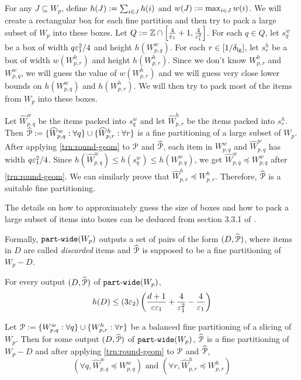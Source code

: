For any $J \subseteq W_p$, define
$h(J) := \sum_{i \in J} h(i)$ and $w(J) := \max_{i \in J} w(i)$.
We will create a rectangular box for each fine partition
and then try to pack a large subset of $W_p$ into these boxes.
Let $Q := \mathbb{Z} \cap \left[\frac{4}{\varepsilon_1}+1, \frac{4}{\varepsilon_1^2}\right]$.
For each $q \in Q$, let $s^w_q$ be a box
of width $q\varepsilon_1^2/4$ and height $h(W^w_{p,q})$.
For each $r \in [1/\delta_{\mathrm{lg}}]$, let $s^h_r$ be a box
of width $w(W^h_{p,r})$ and height $h(W^h_{p,r})$.
Since we don't know $W^h_{p,r}$ and $W^w_{p,q}$,
we will guess the value of $w(W^h_{p,r})$ and
we will guess very close lower bounds on $h(W^w_{p,q})$ and $h(W^h_{p,r})$.
We will then try to pack most of the items from $W_p$ into these boxes.

Let $\widehat{W}^w_{p,q}$ be the items packed into $s^w_q$ and
let $\widehat{W}^h_{p,r}$ be the items packed into $s^h_r$.
Then $\widehat{\mathcal{P}} := \{\widehat{W}_{p,q}^w: \forall q\} \cup \{\widehat{W}_{p,r}^h: \forall r\}$
is a fine partitioning of a large subset of $W_p$.
After applying \cref{trn:round-geom} to $\mathcal{P}$ and $\widehat{\mathcal{P}}$,
each item in $W^w_{p,q}$ and $\widehat{W}^w_{p,q}$ has width $q\varepsilon_1^2/4$.
Since $h(\widehat{W}^w_{p,q}) \le h(s^w_q) \le h(W^w_{p,q})$,
we get $\widehat{W}^w_{p,q} \preceq W^w_{p,q}$ after \cref{trn:round-geom}.
We can similarly prove that $\widehat{W}^h_{p,r} \preceq W^h_{p,r}$.
Therefore, $\widehat{\mathcal{P}}$ is a suitable fine partitioning.

The details on how to approximately guess the size of boxes
and how to pack a large subset of items into boxes can be deduced from
section 3.3.1 of \cite{pradel-thesis}.

Formally, $\operatorname{\mathtt{part-wide}}(W_p)$ outputs a set of pairs of the form $(D, \widehat{\mathcal{P}})$,
where items in $D$ are called \emph{discarded} items and $\widehat{\mathcal{P}}$ is supposed to be
a fine partitioning of $W_p - D$.

\begin{claim}
\label{lem:part-wide-discard}
For every output $(D, \widehat{\mathcal{P}})$ of $\operatorname{\mathtt{part-wide}}(W_p)$,
\[ h(D) \le (3\varepsilon_2)\left( \frac{d+1}{\varepsilon\varepsilon_1} + \frac{4}{\varepsilon_1^2}
    - \frac{4}{\varepsilon_1} \right) \]
\end{claim}

\begin{claim}
\label{lem:part-wide}
Let $\mathcal{P} := \{W_{p,q}^w: \forall q\} \cup \{W_{p,r}^h: \forall r\}$ be
a balanced fine partitioning of a slicing of $W_p$.
Then for some output $(D, \widehat{\mathcal{P}})$ of $\operatorname{\mathtt{part-wide}}(W_p)$,
$\widehat{\mathcal{P}}$ is a fine partitioning of $W_p - D$
and after applying \cref{trn:round-geom} to $\mathcal{P}$ and $\widehat{\mathcal{P}}$,
\[ (\forall q, \widehat{W}^w_{p,q} \preceq W^w_{p,q})
\textrm{ and } (\forall r, \widehat{W}^h_{p,r} \preceq W^h_{p,r}) \]
\end{claim}

